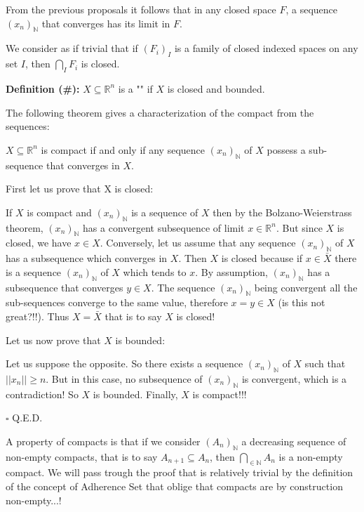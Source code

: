 	From the previous proposals it follows that in any closed space $F$, a sequence $(x_n)_{\mathbb{N}}$ that converges has its limit in $F$.
	
	We consider as if trivial that if $(F_i)_I$ is a family of closed indexed spaces on any set $I$, then $\bigcap_I F_i$ is closed.
	
	\textbf{Definition (\#\mydef):} $X\subseteq \mathbb{R}^n$ is a "" if $X$ is closed and bounded.
	
	The following theorem gives a characterization of the compact from the sequences:
	
	\begin{theorem}
	$X\subseteq \mathbb{R}^n$ is compact if and only if any sequence $(x_n)_\mathbb{N}$ of $X$ possess a sub-sequence that converges in $X$.
	\end{theorem}
	\begin{dem}
	First let us prove that X is closed:
	
	If $X$ is compact and $(x_n)_\mathbb{N}$ is a sequence of $X$ then by the Bolzano-Weierstrass theorem, $(x_n)_\mathbb{N}$  has a convergent subsequence of limit $x\in \mathbb{R}^n$. But since $X$ is closed, we have $x\in X$. Conversely, let us assume that any sequence $(x_n)_\mathbb{N}$  of $X$ has a subsequence which converges in $X$. Then $X$ is closed because if $x\in \bar{X}$ there is a sequence $(x_n)_\mathbb{N}$ of $X$ which tends to $x$. By assumption, $(x_n)_\mathbb{N}$ has a subsequence that converges $y\in X$. The sequence $(x_n)_\mathbb{N}$ being convergent all the sub-sequences converge to the same value, therefore $x=y\in X$ (is this not great?!!). Thus $X=\bar{X}$ that is to say $X$ is closed!
	
	Let us now prove that $X$ is bounded:
	
	Let us suppose the opposite. So there exists a sequence $(x_n)_\mathbb{N}$ of $X$ such that $||x_n||\geq n$. But in this case, no subsequence of $(x_n)_\mathbb{N}$ is convergent, which is a contradiction! So $X$ is bounded. Finally, $X$ is compact!!!
	\begin{flushright}
		$\square$  Q.E.D.
	\end{flushright}
	\end{dem}
	A property of compacts is that if we consider $(A_n)_\mathbb{N}$ a decreasing sequence of non-empty compacts, that is to say $A_{n+1}\subseteq A_n$, then $\bigcap_{\in \mathbb{N}} A_n$ is a non-empty compact. We will pass trough the proof that is relatively trivial by the definition of the concept of Adherence Set that oblige that compacts are by construction non-empty...!
